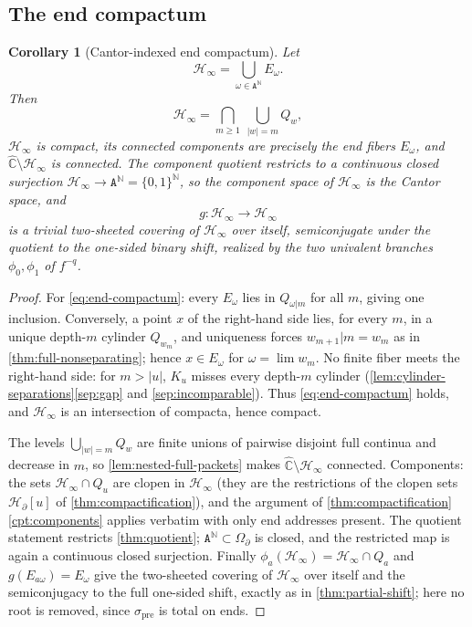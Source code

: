 \documentclass[11pt,reqno]{amsart}
\numberwithin{equation}{section}
\theoremstyle{plain}
\newtheorem{corollary}[theorem]{Corollary}
\theoremstyle{definition}
\theoremstyle{remark}
\newcommand{\Chat}{\widehat{\mathbb C}}
\newcommand{\N}{\mathbb N}
\newcommand{\A}{\mathtt A}
\newcommand{\Ends}{\A^{\N}}
\newcommand{\OmB}{\Omega_\partial}
\newcommand{\HB}{\mathcal H_\partial}
\newcommand{\HE}{\mathcal H_\infty}
\newcommand{\spre}{\sigma_{\mathrm{pre}}}
\begin{document}
\subsection{The end compactum}

\begin{corollary}[Cantor-indexed end compactum]
\label{cor:end-compactum}
Let
\[
 \HE=\bigcup_{\omega\in\Ends}E_\omega .
\]
Then
\begin{equation}
 \HE=\bigcap_{m\ge1}\ \bigcup_{|w|=m}Q_w ,
\label{eq:end-compactum}
\end{equation}
$\HE$ is compact, its connected components are precisely the end fibers
$E_\omega$, and $\Chat\setminus\HE$ is connected.  The component
quotient restricts to a continuous closed surjection
$\HE\to\Ends=\{0,1\}^{\N}$, so the component space of $\HE$ is the
Cantor space, and
\[
 g\colon\HE\longrightarrow\HE
\]
is a trivial two-sheeted covering of $\HE$ over itself, semiconjugate
under the quotient to the one-sided binary shift, realized by the two
univalent branches $\phi_0,\phi_1$ of $f^{-q}$.
\end{corollary}

\begin{proof}
For \eqref{eq:end-compactum}: every $E_\omega$ lies in $Q_{\omega|m}$
for all $m$, giving one inclusion.  Conversely, a point $x$ of the
right-hand side lies, for every $m$, in a unique depth-$m$ cylinder
$Q_{w_m}$, and uniqueness forces $w_{m+1}|m=w_m$ as in
\cref{thm:full-nonseparating}; hence $x\in E_\omega$ for
$\omega=\lim w_m$.  No finite fiber meets the right-hand side: for
$m>|u|$, $K_u$ misses every depth-$m$ cylinder
(\cref{lem:cylinder-separations}\ref{sep:gap} and
\ref{sep:incomparable}).  Thus \eqref{eq:end-compactum} holds, and
$\HE$ is an intersection of compacta, hence compact.

The levels $\bigcup_{|w|=m}Q_w$ are finite unions of pairwise disjoint
full continua and decrease in $m$, so \cref{lem:nested-full-packets}
makes $\Chat\setminus\HE$ connected.  Components: the sets
$\HE\cap Q_u$ are clopen in $\HE$ (they are the restrictions of the
clopen sets $\HB[u]$ of \cref{thm:compactification}), and the argument
of \cref{thm:compactification}\ref{cpt:components} applies verbatim
with only end addresses present.  The quotient statement restricts
\cref{thm:quotient}; $\Ends\subset\OmB$ is closed, and the restricted
map is again a continuous closed surjection.  Finally
$\phi_a(\HE)=\HE\cap Q_a$ and $g(E_{a\omega})=E_\omega$ give the
two-sheeted covering of $\HE$ over itself and the semiconjugacy to the
full one-sided shift, exactly as in \cref{thm:partial-shift}; here no
root is removed, since $\spre$ is total on ends.
\end{proof}
\end{document}
